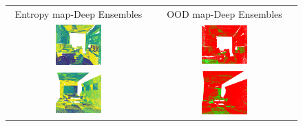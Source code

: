         \begin{figure}[h!]
            \centering
            \begin{tabular}{cc}
                Entropy map-Deep Ensembles & OOD map-Deep Ensembles \\
                \includegraphics[width=0.33\textwidth, height=0.18\textheight]{images/ood_imgs/de_s3dis/ofc_3_de_ent.png}& 
                \includegraphics[width=0.33\textwidth, height=0.18\textheight]{images/ood_imgs/de_s3dis/de_ent_2.png}\\
    
                \includegraphics[width=0.33\textwidth, height=0.18\textheight]{images/ood_imgs/de_s3dis/cf1_de_ent.png}& 
                \includegraphics[width=0.33\textwidth, height=0.18\textheight]{images/ood_imgs/de_s3dis/de_ent_4.png}\\
    

\end{tabular}
\end{figure}
